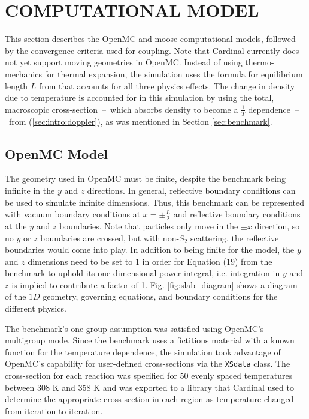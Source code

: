 \documentclass[letterpaper]{mc2023}
\begin{document}
\section{COMPUTATIONAL MODEL}
\label{sec:model}
This section describes the OpenMC and \gls{moose} computational models, followed by the convergence criteria used for coupling.
Note that Cardinal currently does not yet support moving geometries in OpenMC. Instead of using thermo-mechanics for thermal
expansion, the simulation uses the formula for equilibrium length $L$ from \cite{analytical_benchmark} that accounts for all
three physics effects. The change in density due to temperature is accounted for in this simulation by using the total, macroscopic
cross-section\ --\ which absorbs density to become a $\frac{1}{T}$ dependence\ --\ from (\ref{sec:intro:doppler}), as was
mentioned in Section \ref{sec:benchmark}.

\subsection{OpenMC Model}
\label{sec:model:OpenMC}
The geometry used in OpenMC must be finite, despite the benchmark being infinite in the $y$ and $z$ directions. In general,
reflective boundary conditions can be used to simulate infinite dimensions. Thus, this benchmark can be represented with
vacuum boundary conditions at $x=\pm \frac{L}{2}$ and reflective boundary conditions at the $y$ and $z$ boundaries. Note that
particles only move in the $\pm x$ direction, so no $y$ or $z$ boundaries are crossed, but with non-$S_{2}$ scattering, the
reflective boundaries would come into play. In addition to being finite for the model, the $y$ and $z$ dimensions need to be
set to $1$ in order for Equation (19) from the benchmark to uphold its one dimensional power integral, i.e. integration in
$y$ and $z$ is implied to contribute a factor of 1. \cite{analytical_benchmark} Fig. \ref{fig:slab_diagram} shows a diagram
of the $1D$ geometry, governing equations, and boundary conditions for the different physics.

The benchmark's one-group assumption was satisfied using OpenMC's multigroup mode. Since the benchmark uses a fictitious material
with a known function for the temperature dependence, the simulation took advantage of OpenMC's capability for user-defined
cross-sections via the \texttt{XSdata} class. The cross-section for each reaction was specified for 50 evenly spaced temperatures
between 308 K and 358 K and was exported to a library that Cardinal used to determine the appropriate cross-section in each region
as temperature changed from iteration to iteration.
\end{document}
